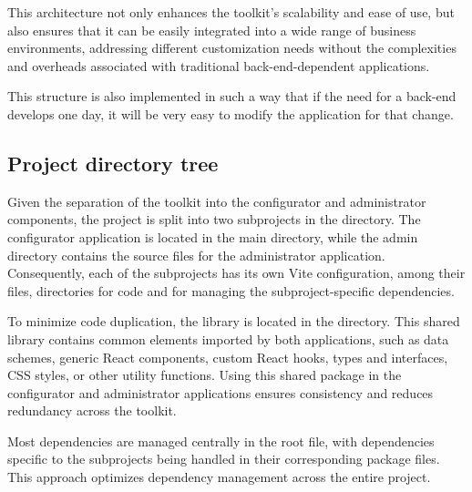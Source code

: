 This architecture not only enhances the toolkit's scalability and ease of use, but also ensures that it can be easily integrated into a wide range of business environments, addressing different customization needs without the complexities and overheads associated with traditional back-end-dependent applications.

This structure is also implemented in such a way that if the need for a back-end develops one day, it will be very easy to modify the application for that change.

\subsection{Project directory tree}

\vspace{16pt}

Given the separation of the toolkit into the configurator and administrator components, the project is split into two subprojects in the  directory. The configurator application is located in the main directory, while the admin directory contains the source files for the administrator application. Consequently, each of the subprojects has its own Vite configuration, among their  files,  directories for code and  for managing the subproject-specific dependencies. 

To minimize code duplication, the  library is located in the  directory. This shared library contains common elements imported by both applications, such as data schemes, generic React components, custom React hooks, types and interfaces, CSS styles, or other utility functions. Using this shared package in the configurator and administrator applications ensures consistency and reduces redundancy across the toolkit.

Most dependencies are managed centrally in the root  file, with dependencies specific to the subprojects being handled in their corresponding package files. This approach optimizes dependency management across the entire project.


